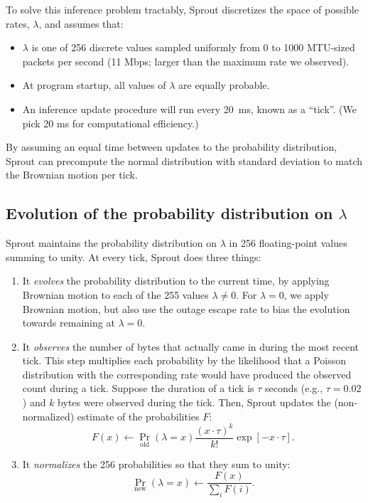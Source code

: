 To solve this inference problem tractably, Sprout discretizes the
space of possible rates, $\lambda$, and assumes that:

\begin{itemize}

\item $\lambda$ is one of 256 discrete values sampled uniformly from 0
  to 1000 MTU-sized packets per second (11 Mbps; larger than
  the maximum rate we observed).

\item At program startup, all values of $\lambda$ are equally
  probable.

\item An inference update procedure will run every 20~ms, known as a
  ``tick''. (We pick 20 ms for computational efficiency.)


\end{itemize}

By assuming an equal time between updates to the probability
distribution, Sprout can precompute the normal distribution with
standard deviation to match the Brownian motion per tick.

\subsection{Evolution of the probability distribution on $\lambda$}

Sprout maintains the probability distribution on $\lambda$ in 256
floating-point values summing to unity. At every tick, Sprout does
three things:

\begin{enumerate}

\item It \emph{evolves} the probability distribution to the current
  time, by applying Brownian motion to each of the 255 values $\lambda
  \not = 0$. For $\lambda = 0$, we apply Brownian motion, but also use
  the outage escape rate to bias the evolution towards remaining at
  $\lambda = 0$.
  
\item It \emph{observes} the number of bytes that actually came in
  during the most recent tick. This step multiplies each probability
  by the likelihood that a Poisson distribution with the corresponding
  rate would have produced the observed count during a tick. Suppose
  the duration of a tick is $\tau$ seconds (e.g., $\tau = 0.02$) and
  $k$ bytes were observed during the tick. Then, Sprout updates the
  (non-normalized) estimate of the probabilities $F$:
 $$
 F(x) \leftarrow
 \Pr_{\textrm{old}}(\lambda = x) \frac{(x \cdot \tau)^k}{k!}  \exp[-x \cdot \tau].
 $$

\item It \emph{normalizes} the 256 probabilities so that they sum to unity:
$$
\Pr_{\textrm{new}}(\lambda = x) \leftarrow \frac{F(x)}{\sum_i F(i)} .
$$
\end{enumerate}

